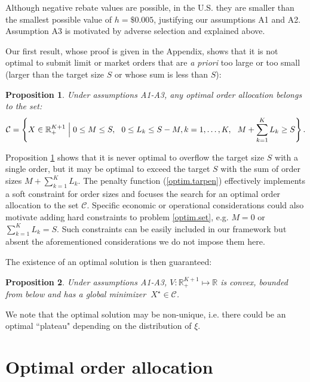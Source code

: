\documentclass[opre,nonblindrev]{informs3}
\newtheorem{myprop}{Proposition}
\begin{document}
\noindent Although negative rebate values are possible, in the U.S. they are smaller than the smallest possible value of $h=\$0.005$, justifying our assumptions A1 and A2. Assumption A3 is motivated by adverse selection and explained above.

Our first result, whose proof is given in  the Appendix, shows that it is not optimal to submit limit or market orders that are {\it a priori} too large or too small (larger than the target size $S$ or whose sum is less than $S$):
\begin{myprop}\label{prop.lubound} Under assumptions A1-A3, any optimal order allocation belongs to the set:
 $$\mathcal{C}=\left\{X\in\mathbb{R}^{K+1}_+\Bigm| 0\leq M\leq S,~~0\leq L_k\leq S-M, k=1,\dots,K, ~~M+\sum_{k=1}^K{L_k}\geq S\right\}.$$
\end{myprop}
Proposition \ref{prop.lubound} shows that it is never optimal to overflow the target size $S$ with a single order, but it may be optimal to exceed the target $S$ with the sum of order sizes $M+\sum_{k=1}^K{L_k}$. The penalty function (\ref{optim.tarpen}) effectively implements a soft constraint for order sizes and focuses the search for an optimal order allocation to the set $\mathcal{C}$. Specific economic or operational considerations could also motivate adding hard constraints to problem \eqref{optim.set}, e.g. $M=0$ or $\sum_{k=1}^K{L_k}=S$. Such constraints can be easily included in our framework but absent the aforementioned considerations we do not impose them here.

The existence of an optimal solution is then guaranteed:
\begin{myprop}\label{prop.objfun}
Under assumptions A1-A3, $V:\mathbb{R}^{K+1}_+\mapsto \mathbb{R}$  is convex, bounded from below and has a global minimizer%
 $~X^\star\in\mathcal{C}$.
\end{myprop}
We note that the optimal solution may be non-unique, i.e. there could be an optimal ``plateau" depending on the distribution of $\xi$.


\section{Optimal order allocation}
\end{document}
